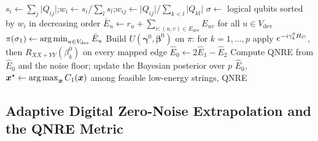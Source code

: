 \begin{algorithm}[htbp]
\caption{\deal\ with dynamic physical mapping.}\label{alg:deal}
$s_{i}\gets\sum_{j}\lvert Q_{ij}\rvert$;\quad $w_{i}\gets s_{i}/\sum_{l}s_{l}$;\quad $w_{ij}\gets \lvert Q_{ij}\rvert/\sum_{k<l}\lvert Q_{kl}\rvert$ 
$\sigma\gets$ logical qubits sorted by $w_{i}$ in decreasing order\;
$\bar{E}_{u}\gets r_{u}+\sum_{v:(u,v)\in E_{\mathrm{dev}}}E_{uv}$ for all $u\in V_{\mathrm{dev}}$ 
$\pi(\sigma_{1})\gets\operatorname*{arg\,min}_{u\in V_{\mathrm{dev}}}\bar{E}_{u}$\;
Build $U(\bm{\gamma}^{0},\bm{\beta}^{0})$ on $\pi$: for $k=1,\dots,p$ apply $e^{-i\gamma_{k}^{0}H_C}$, then $R_{XX+YY}(\beta_{k}^{0})$ on every mapped edge\;
$\hat{E}_{0}\gets 2\hat{E}_{1}-\hat{E}_{2}$ 
Compute QNRE from $\hat{E}_{0}$ and the noise floor; update the Bayesian posterior over $p$\;
\Return $\hat{E}_{0}$, $\bm{x}^{\star}\gets\operatorname*{arg\,max}_{\bm{x}}C_{1}(\bm{x})$ among feasible low-energy strings, QNRE\;
\end{algorithm}

\subsection{Adaptive Digital Zero-Noise Extrapolation and the QNRE Metric}\label{sec:nisq:zne}

